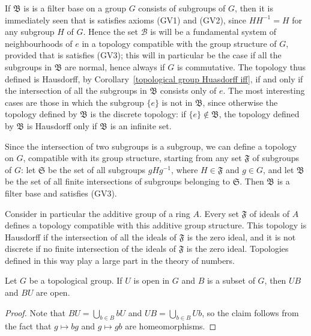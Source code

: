 \begin{example}\label{topological group given by filter of subgroups}
If $\mathfrak{B}$ is is a filter base on a group $G$ consists of subgroups of $G$, then it is immediately seen that is satisfies axioms (GV1) and (GV2), since $HH^{-1}=H$ for any subgroup $H$ of $G$. Hence the set $\mathcal{B}$ is will be a fundamental system of neighbourhoods of $e$ in a topology compatible with the group structure of $G$, provided that is satisfies (GV3); this will in particular be the case if all the subgroups in $\mathfrak{B}$ are normal, hence always if $G$ is commutative. The topology thus defined is Hausdorff, by Corollary~\ref{topological group Huasdorff iff}, if and only if the intersection of all the subgroups in $\mathfrak{B}$ consists only of $e$. The most interesting cases are those in which the subgroup $\{e\}$ is not in $\mathfrak{B}$, since otherwise the topology defined by $\mathfrak{B}$ is the discrete topology: if $\{e\}\notin\mathfrak{B}$, the topology defined by $\mathfrak{B}$ is Hausdorff only if $\mathfrak{B}$ is an infinite set.\par
Since the intersection of two subgroups is a subgroup, we can define a topology on $G$, compatible with its group structure, starting from any set $\mathfrak{F}$ of subgroups of $G$: let $\mathfrak{S}$ be the set of all subgroups $gHg^{-1}$, where $H\in\mathfrak{F}$ and $g\in G$, and let $\mathfrak{B}$ be the set of all finite intersections of subgroups belonging to $\mathfrak{S}$. Then $\mathfrak{B}$ is a filter base and satisfies (GV3).\par
Consider in particular the additive group of a ring $A$. Every set $\mathfrak{F}$ of ideals of $A$ defines a topology compatible with this additive group structure. This topology is Hausdorff if the intersection of all the ideals of $\mathfrak{F}$ is the zero ideal, and it is not discrete if no finite intersection of the ideals of $\mathfrak{F}$ is the zero ideal. Topologies defined in this way play a large part in the theory of numbers.
\end{example}
\begin{proposition}\label{topological group product of open and subset}
Let $G$ be a topological group. If $U$ is open in $G$ and $B$ is a subset of $G$, then $UB$ and $BU$ are open.
\end{proposition}
\begin{proof}
Note that $BU=\bigcup_{b\in B}bU$ and $UB=\bigcup_{b\in B}Ub$, so the claim follows from the fact that $g\mapsto bg$ and $g\mapsto gb$ are homeomorphisms.
\end{proof}
